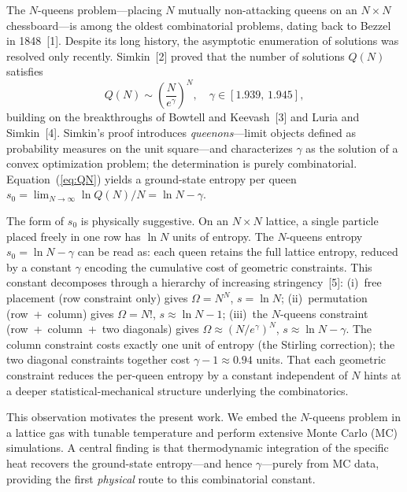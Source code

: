 \documentclass{iopjournal}
\begin{document}
The $N$-queens problem---placing $N$ mutually non-attacking queens
on an $N \times N$ chessboard---is among the oldest combinatorial
problems, dating back to Bezzel in 1848~[1].  Despite its long
history, the asymptotic enumeration of solutions was resolved only
recently.  Simkin~[2] proved that the number of solutions $Q(N)$
satisfies
\begin{equation}
  Q(N) \sim \left(\frac{N}{e^{\gamma}} \right)^N, \quad
  \gamma \in [1.939,\, 1.945],
  \label{eq:QN}
\end{equation}
building on the breakthroughs of Bowtell and Keevash~[3] and
Luria and Simkin~[4].  Simkin's proof introduces
\emph{queenons}---limit objects defined as probability measures on
the unit square---and characterizes $\gamma$ as the solution of a
convex optimization problem; the determination is purely
combinatorial.  Equation~(\ref{eq:QN}) yields a ground-state
entropy per queen
$s_0 = \lim_{N \to \infty} \ln Q(N)/N = \ln N - \gamma$.

The form of $s_0$ is physically suggestive.  On an $N \times N$
lattice, a single particle placed freely in one row has $\ln N$
units of entropy.  The $N$-queens entropy
$s_0 = \ln N - \gamma$ can be read as: each queen retains the full
lattice entropy, reduced by a constant $\gamma$ encoding the
cumulative cost of geometric constraints.  This constant decomposes
through a hierarchy of increasing stringency~[5]:
(i)~free placement (row constraint only) gives
$\Omega = N^N$, $s = \ln N$;
(ii)~permutation (row~+~column) gives
$\Omega = N!$, $s \approx \ln N - 1$;
(iii)~the $N$-queens constraint (row~+~column~+~two diagonals)
gives $\Omega \approx (N/e^\gamma)^N$,
$s \approx \ln N - \gamma$.
The column constraint costs exactly one unit of entropy (the
Stirling correction); the two diagonal constraints together cost
$\gamma - 1 \approx 0.94$ units.  That each geometric constraint
reduces the per-queen entropy by a constant independent of $N$
hints at a deeper statistical-mechanical structure underlying the
combinatorics.

This observation motivates the present work.  We embed the
$N$-queens problem in a lattice gas with tunable temperature and
perform extensive Monte Carlo (MC) simulations.  A central finding
is that thermodynamic integration of the specific heat recovers the
ground-state entropy---and hence $\gamma$---purely from MC data,
providing the first \emph{physical} route to this combinatorial
constant.
\end{document}
